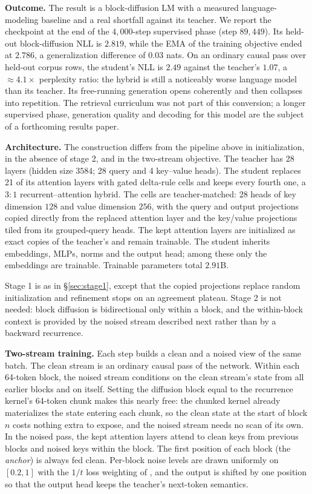 \documentclass{article}
\begin{document}
\textbf{Outcome.} The result is a block-diffusion LM with a measured language-modeling baseline and a real shortfall against its teacher. We report the checkpoint at the end of the $4{,}000$-step supervised phase (step $89{,}449$). Its held-out block-diffusion NLL is $2.819$, while the EMA of the training objective ended at $2.786$, a generalization difference of $0.03$ nats. On an ordinary causal pass over held-out corpus rows, the student's NLL is $2.49$ against the teacher's $1.07$, a ${\approx}4.1\times$ perplexity ratio: the hybrid is still a noticeably worse language model than its teacher. Its free-running generation opens coherently and then collapses into repetition. The retrieval curriculum was not part of this conversion; a longer supervised phase, generation quality and decoding for this model are the subject of a forthcoming results paper.

\textbf{Architecture.} The construction differs from the pipeline above in initialization, in the absence of stage 2, and in the two-stream objective. The teacher has 28 layers (hidden size $3584$; 28 query and 4 key--value heads). The student replaces 21 of its attention layers with gated delta-rule cells and keeps every fourth one, a $3{:}1$ recurrent--attention hybrid. The cells are teacher-matched: 28 heads of key dimension $128$ and value dimension $256$, with the query and output projections copied directly from the replaced attention layer and the key/value projections tiled from its grouped-query heads. The kept attention layers are initialized as exact copies of the teacher's and remain trainable. The student inherits embeddings, MLPs, norms and the output head; among these only the embeddings are trainable. Trainable parameters total $2.91$B.

Stage 1 is as in \S\ref{sec:stage1}, except that the copied projections replace random initialization and refinement stops on an agreement plateau. Stage 2 is not needed: block diffusion is bidirectional only within a block, and the within-block context is provided by the noised stream described next rather than by a backward recurrence.

\textbf{Two-stream training.} Each step builds a clean and a noised view of the same batch. The clean stream is an ordinary causal pass of the network. Within each 64-token block, the noised stream conditions on the clean stream's state from all earlier blocks and on itself. Setting the diffusion block equal to the recurrence kernel's 64-token chunk makes this nearly free: the chunked kernel already materializes the state entering each chunk, so the clean state at the start of block $n$ costs nothing extra to expose, and the noised stream needs no scan of its own. In the noised pass, the kept attention layers attend to clean keys from previous blocks and noised keys within the block. The first position of each block (the \emph{anchor}) is always fed clean. Per-block noise levels are drawn uniformly on $[0.2, 1]$ with the $1/t$ loss weighting of \citet{sahoo2024mdlm}, and the output is shifted by one position so that the output head keeps the teacher's next-token semantics.
\end{document}
